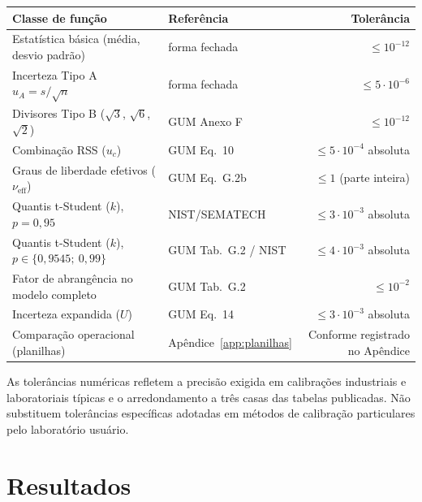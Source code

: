 \documentclass[11pt,a4paper]{article}
\begin{document}
\begin{table}[H]
  \centering
  \small
  \begin{tabularx}{\textwidth}{l X r}
    \toprule
    \textbf{Classe de função} & \textbf{Referência} & \textbf{Tolerância} \\
    \midrule
    Estatística básica (média, desvio padrão)                       & forma fechada          & \(\leq 10^{-12}\) \\
    Incerteza Tipo A \(u_A = s/\sqrt{n}\)                             & forma fechada          & \(\leq 5 \cdot 10^{-6}\) \\
    Divisores Tipo B (\(\sqrt{3}\), \(\sqrt{6}\), \(\sqrt{2}\))      & GUM Anexo F            & \(\leq 10^{-12}\) \\
    Combinação RSS (\(u_c\))                                         & GUM Eq.~10             & \(\leq 5 \cdot 10^{-4}\) absoluta \\
    Graus de liberdade efetivos (\(\nu_\text{eff}\))                 & GUM Eq.~G.2b           & \(\leq 1\) (parte inteira) \\
    Quantis t-Student (\(k\)), \(p = 0{,}95\)                        & NIST/SEMATECH          & \(\leq 3 \cdot 10^{-3}\) absoluta \\
    Quantis t-Student (\(k\)), \(p \in \{0{,}9545;\ 0{,}99\}\)       & GUM Tab.~G.2 / NIST    & \(\leq 4 \cdot 10^{-3}\) absoluta \\
    Fator de abrangência no modelo completo                          & GUM Tab.~G.2           & \(\leq 10^{-2}\) \\
    Incerteza expandida (\(U\))                                      & GUM Eq.~14             & \(\leq 3 \cdot 10^{-3}\) absoluta \\
    Comparação operacional (planilhas)                               & Apêndice~\ref{app:planilhas} & Conforme registrado no Apêndice \\
    \bottomrule
  \end{tabularx}
\end{table}

As tolerâncias numéricas refletem a precisão exigida em calibrações industriais e laboratoriais típicas e o arredondamento a três casas das tabelas publicadas. Não substituem tolerâncias específicas adotadas em métodos de calibração particulares pelo laboratório usuário.

\section{Resultados}
\label{sec:resultados}
\end{document}
